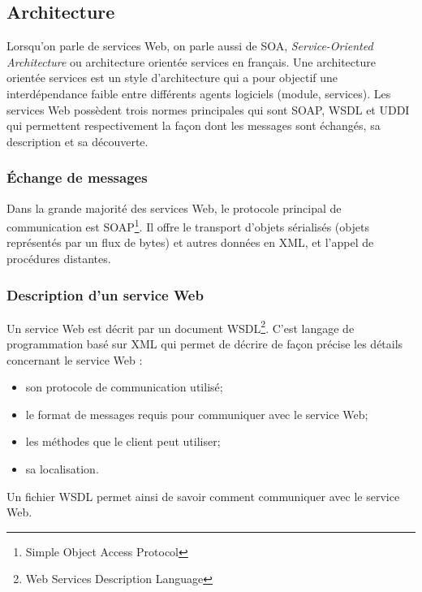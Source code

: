 \subsection{Architecture}

Lorsqu'on parle de services Web, on parle aussi de SOA, \textit{Service-Oriented Architecture} ou architecture orient\'ee services en fran\c{c}ais.
Une architecture orient\'ee services est un style d'architecture qui a pour objectif une interd\'ependance faible entre diff\'erents agents logiciels (module, services).
Les services Web poss\`edent trois normes principales qui sont SOAP, WSDL et UDDI qui permettent respectivement la fa\c{c}on dont les messages sont \'echang\'es, sa description et sa d\'ecouverte.

\subsubsection{\'Echange de messages}

Dans la grande majorit\'e des services Web, le protocole principal de communication est SOAP\protect\footnote{Simple Object Access Protocol}.
Il offre le transport d'objets s\'erialis\'es (objets repr\'esent\'es par un flux de bytes) et autres donn\'ees en XML, et l'appel de proc\'edures distantes.

\subsubsection{Description d'un service Web}

Un service Web est d\'ecrit par un document WSDL\protect\footnote{Web Services Description Language}.
C'est langage de programmation bas\'e sur XML qui permet de d\'ecrire de fa\c{c}on pr\'ecise les d\'etails concernant le service Web :

\begin{itemize}
	\item son protocole de communication utilis\'e;
	\item le format de messages requis pour communiquer avec le service Web;
	\item les m\'ethodes que le client peut utiliser;
	\item sa localisation.

\end{itemize}

\vspace{0.20cm}

\noindent Un fichier WSDL permet ainsi de savoir comment communiquer avec le service Web.

